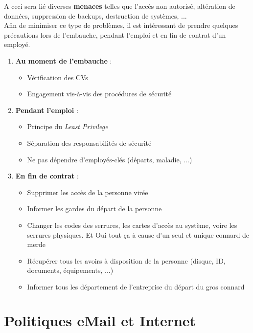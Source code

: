\documentclass{report}
\begin{document}
A ceci sera lié diverses \textbf{menaces} telles que l'accès non autorisé, altération de données, suppression de backups, destruction de systèmes, ...\\

Afin de minimiser ce type de problèmes, il est intéressant de prendre quelques précautions lors de l'embauche, pendant l'emploi et en fin de contrat d'un employé.

\begin{enumerate}
    \item \textbf{Au moment de l'embauche} :
    \begin{itemize}
        \item Vérification des CVs
        \item Engagement vis-à-vis des procédures de sécurité
    \end{itemize}

    \item \textbf{Pendant l'emploi} :
    \begin{itemize}
        \item Principe du \textit{Least Privilege}
        \item Séparation des responsabilités de sécurité
        \item Ne pas dépendre d'employés-clés (départs, maladie, ...)
    \end{itemize}

    \item \textbf{En fin de contrat} :
    \begin{itemize}
        \item Supprimer les accès de la personne virée
        \item Informer les gardes du départ de la personne
        \item Changer les codes des serrures, les cartes d'accès au système, voire les serrures physiques. Et Oui tout ça à cause d'un seul et unique connard de merde
        \item Récupérer tous les avoirs à disposition de la personne (disque, ID, documents, équipements, ...)
        \item Informer tous les département de l'entreprise du départ du gros connard
    \end{itemize}
\end{enumerate}

\section{Politiques eMail et Internet}
\end{document}
